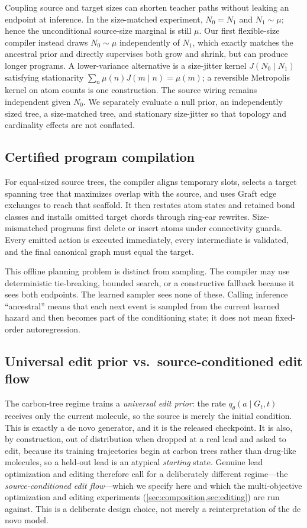 \documentclass{article}
\theoremstyle{definition}
\theoremstyle{remark}
\begin{document}
Coupling source and target sizes can shorten teacher paths without leaking an endpoint at inference. In the size-matched experiment, $N_0=N_1$ and $N_1\sim\mu$; hence the unconditional source-size marginal is still $\mu$. Our first flexible-size compiler instead draws $N_0\sim\mu$ independently of $N_1$, which exactly matches the ancestral prior and directly supervises both grow and shrink, but can produce longer programs. A lower-variance alternative is a size-jitter kernel $J(N_0\mid N_1)$ satisfying stationarity $\sum_n\mu(n)J(m\mid n)=\mu(m)$; a reversible Metropolis kernel on atom counts is one construction. The source wiring remains independent given $N_0$. We separately evaluate a null prior, an independently sized tree, a size-matched tree, and stationary size-jitter so that topology and cardinality effects are not conflated.

\subsection{Certified program compilation}

For equal-sized source trees, the compiler aligns temporary slots, selects a target spanning tree that maximizes overlap with the source, and uses Graft edge exchanges to reach that scaffold. It then restates atom states and retained bond classes and installs omitted target chords through ring-ear rewrites. Size-mismatched programs first delete or insert atoms under connectivity guards. Every emitted action is executed immediately, every intermediate is validated, and the final canonical graph must equal the target.

This offline planning problem is distinct from sampling. The compiler may use deterministic tie-breaking, bounded search, or a constructive fallback because it sees both endpoints. The learned sampler sees none of these. Calling inference ``ancestral'' means that each next event is sampled from the current learned hazard and then becomes part of the conditioning state; it does not mean fixed-order autoregression.

\subsection{Universal edit prior vs.\ source-conditioned edit flow}
\label{sec:source-conditioned}

The carbon-tree regime trains a \emph{universal edit prior}: the rate $q_\theta(a\mid G_t,t)$ receives only the current molecule, so the source is merely the initial condition. This is exactly a de novo generator, and it is the released checkpoint. It is also, by construction, out of distribution when dropped at a real lead and asked to edit, because its training trajectories begin at carbon trees rather than drug-like molecules, so a held-out lead is an atypical \emph{starting} state. Genuine lead optimization and editing therefore call for a deliberately different regime---the \emph{source-conditioned edit flow}---which we specify here and which the multi-objective optimization and editing experiments (\cref{sec:composition,sec:editing}) are run against. This is a deliberate design choice, not merely a reinterpretation of the de novo model.
\end{document}
